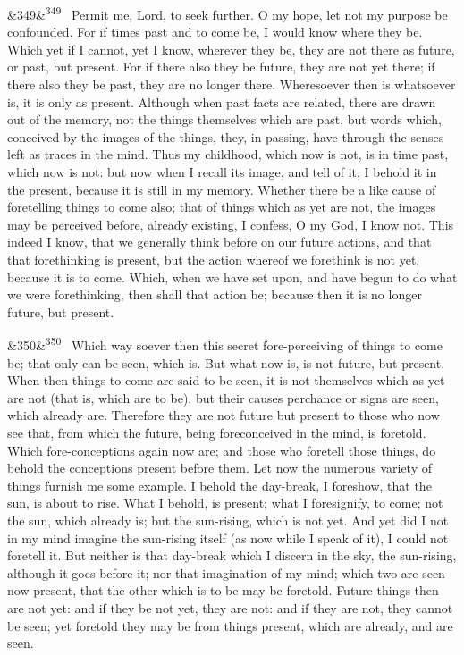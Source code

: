 \documentclass[12pt]{article}
\newcommand{\para}[1][]{\par\noindent\ifx&#1&\else\textsuperscript{\footnotesize #1}~\fi}
\begin{document}
\para[349] Permit me, Lord, to seek further. O my hope, let not my purpose be confounded. For if times past and to come be, I would know where they be. Which yet if I cannot, yet I know, wherever they be, they are not there as future, or past, but present. For if there also they be future, they are not yet there; if there also they be past, they are no longer there. Wheresoever then is whatsoever is, it is only as present. Although when past facts are related, there are drawn out of the memory, not the things themselves which are past, but words which, conceived by the images of the things, they, in passing, have through the senses left as traces in the mind. Thus my childhood, which now is not, is in time past, which now is not: but now when I recall its image, and tell of it, I behold it in the present, because it is still in my memory. Whether there be a like cause of foretelling things to come also; that of things which as yet are not, the images may be perceived before, already existing, I confess, O my God, I know not. This indeed I know, that we generally think before on our future actions, and that that forethinking is present, but the action whereof we forethink is not yet, because it is to come. Which, when we have set upon, and have begun to do what we were forethinking, then shall that action be; because then it is no longer future, but present.

\para[350] Which way soever then this secret fore-perceiving of things to come be; that only can be seen, which is. But what now is, is not future, but present. When then things to come are said to be seen, it is not themselves which as yet are not (that is, which are to be), but their causes perchance or signs are seen, which already are. Therefore they are not future but present to those who now see that, from which the future, being foreconceived in the mind, is foretold. Which fore-conceptions again now are; and those who foretell those things, do behold the conceptions present before them. Let now the numerous variety of things furnish me some example. I behold the day-break, I foreshow, that the sun, is about to rise. What I behold, is present; what I foresignify, to come; not the sun, which already is; but the sun-rising, which is not yet. And yet did I not in my mind imagine the sun-rising itself (as now while I speak of it), I could not foretell it. But neither is that day-break which I discern in the sky, the sun-rising, although it goes before it; nor that imagination of my mind; which two are seen now present, that the other which is to be may be foretold. Future things then are not yet: and if they be not yet, they are not: and if they are not, they cannot be seen; yet foretold they may be from things present, which are already, and are seen.
\end{document}
